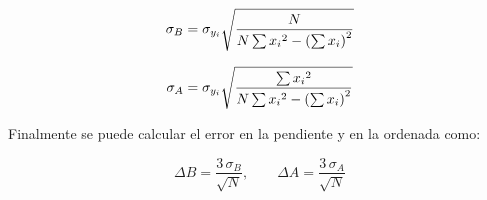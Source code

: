 \begin{equation}
    \label{ec:apendice:desviacion-pendiente-mc}
    \sigma_B = \sigma_{y_i} \sqrt { \frac{N}{N \sum {x_i}^2 - \left( \sum x_i \right)^2} }
\end{equation}

\vspace{5mm}
\begin{equation}
    \label{ec:apendice:desviacion-ordenada-mc}
    \sigma_A = \sigma_{y_i} \sqrt { \frac{ \sum {x_i}^2 }{ N \sum {x_i}^2 - \left( \sum x_i \right)^2 } }
\end{equation}

\vspace{5mm}
Finalmente se puede calcular el error en la pendiente y en la ordenada como:

\begin{equation}
    \label{ec:apendice:errores-mc}
    \Delta B = \frac{3\,\sigma_B}{\sqrt{N}}, \quad\quad
    \Delta A = \frac{3\,\sigma_A}{\sqrt{N}}
\end{equation}
